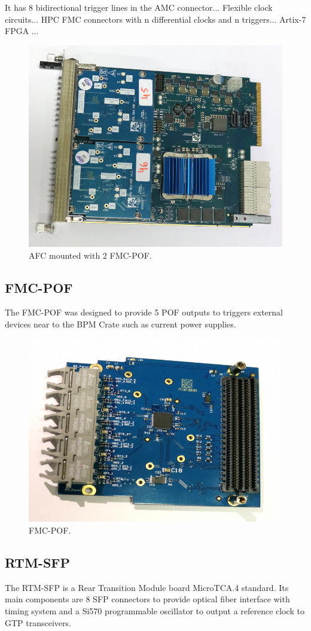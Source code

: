 \documentclass[a4paper,
               biblatex,      %
               ]{jacow}
\begin{document}
It has 8 bidirectional trigger lines in the AMC connector... Flexible clock circuits... HPC FMC connectors with n differential clocks and n triggers... Artix-7 FPGA ...

\begin{figure}[!htb]
   \centering
   \includegraphics*[width=0.8\columnwidth]{AFC_POFs_resized}
   \caption{AFC mounted with 2 FMC-POF.}
   \label{fig:afc_pofs}
\end{figure}

\subsection{FMC-POF}
The FMC-POF \cite{fmc-pof-git} was designed to provide 5 POF outputs to triggers external devices near to the BPM Crate such as current power supplies.

\begin{figure}[!htb]
   \centering
   \includegraphics*[width=0.5\columnwidth]{FMC_POF_resized}
   \caption{FMC-POF.}
   \label{fig:fmc_pof}
\end{figure}

\subsection{RTM-SFP}
The RTM-SFP \cite{rtm-sfp-git} is a Rear Transition Module board MicroTCA.4 standard. Its main components are 8 SFP connectors to provide optical fiber interface with timing system and a Si570 programmable oscillator to output a reference clock to GTP transceivers. 
\end{document}
